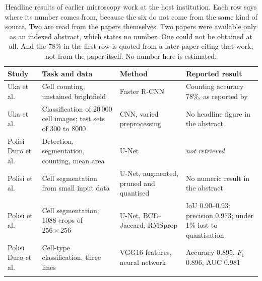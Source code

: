 \begin{table}[htbp]
    \caption{Headline results of earlier microscopy work at the host institution.
    Each row says where its number comes from, because the six do not come from
    the same kind of source. Two are read from the papers themselves. Two papers
    were available only as an indexed abstract, which states no number. One could
    not be obtained at all. And the 78\% in the first row is quoted from a later
    paper citing that work, not from the paper itself. No number here is
    estimated.}
    \label{tab:epoka_results}
    \begin{tabular}{p{3.1cm}p{3.2cm}p{2.4cm}p{2.9cm}}
        \toprule
        Study & Task and data & Method & Reported result \\
        \midrule
        Uka et al. \cite{uka2020faster} &
        Cell counting, unstained brightfield &
        Faster R-CNN &
        Counting accuracy 78\%, as reported by \cite{ferreira2024classification} \\
        \addlinespace
        Uka et al. \cite{uka2020preprocessing} &
        Classification of 20\,000 cell images; test sets of 300 to 8000 &
        CNN, varied preprocessing &
        No headline figure in the abstract \\
        \addlinespace
        Polisi Duro et al. \cite{polisi2024detection} &
        Detection, segmentation, counting, mean area &
        U-Net &
        \emph{not retrieved} \\
        \addlinespace
        Polisi et al. \cite{polisi2023pruning} &
        Cell segmentation from small input data &
        U-Net, augmented, pruned and quantised &
        No numeric result in the abstract \\
        \addlinespace
        Polisi et al. \cite{polisi2025efficient} &
        Cell segmentation; 1088 crops of $256 \times 256$ &
        U-Net, BCE--Jaccard, RMSprop &
        IoU 0.90--0.93; precision 0.973; under 1\% lost to quantisation \\
        \addlinespace
        Polisi Duro et al. \cite{polisiduro2025optimizing} &
        Cell-type classification, three lines &
        VGG16 features, neural network &
        Accuracy 0.895, $F_1$ 0.896, AUC 0.981 \\
        \addlinespace
        \bottomrule
    \end{tabular}
\end{table}

